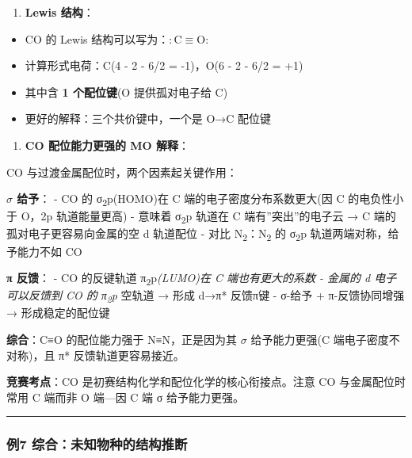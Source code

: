 \begin{enumerate}
\def\labelenumi{(\arabic{enumi})}
\setcounter{enumi}{2}
\tightlist
\item
  \textbf{Lewis 结构}：
\end{enumerate}

\begin{itemize}
\tightlist
\item
  CO 的 Lewis 结构可以写为：\(\mathrm{:C≡O:}\)
\item
  计算形式电荷：C(4 - 2 - 6/2 = -1)，O(6 - 2 - 6/2 = +1)
\item
  其中含 \textbf{1 个配位键}(O 提供孤对电子给 C)
\item
  更好的解释：三个共价键中，一个是 O→C 配位键
\end{itemize}

\begin{enumerate}
\def\labelenumi{(\arabic{enumi})}
\setcounter{enumi}{3}
\tightlist
\item
  \textbf{CO 配位能力更强的 MO 解释}：
\end{enumerate}

CO 与过渡金属配位时，两个因素起关键作用：

\textbf{\(\sigma\) 给予}：
- CO 的 σ\textsubscript{2}p(HOMO)在 C 端的电子密度分布系数更大(因 C 的电负性小于 O，2p 轨道能量更高)
- 意味着 σ\textsubscript{2}p 轨道在 C 端有''突出''的电子云 → C 端的孤对电子更容易向金属的空 d 轨道配位
- 对比 N\textsubscript{2}：N\textsubscript{2} 的 σ\textsubscript{2}p 轨道两端对称，给予能力不如 CO

\textbf{π 反馈}：
- CO 的反键轨道 π\textsubscript{2}p\emph{(LUMO)在 C 端也有更大的系数
- 金属的 d 电子可以反馈到 CO 的 π\textsubscript{2}p} 空轨道 → 形成 d→π* 反馈π键
- σ-给予 + π-反馈协同增强 → 形成稳定的配位键

\textbf{综合}：C≡O 的配位能力强于 N≡N，正是因为其 \(\sigma\) 给予能力更强(C 端电子密度不对称)，且 π* 反馈轨道更容易接近。

\textbf{竞赛考点}：CO 是初赛结构化学和配位化学的核心衔接点。注意 CO 与金属配位时常用 C 端而非 O 端---因 C 端 σ 给予能力更强。

\begin{center}\rule{0.5\linewidth}{0.5pt}\end{center}

\subsubsection{例7 综合：未知物种的结构推断}\label{ux4f8b7-ux7efcux5408ux672aux77e5ux7269ux79cdux7684ux7ed3ux6784ux63a8ux65ad}

